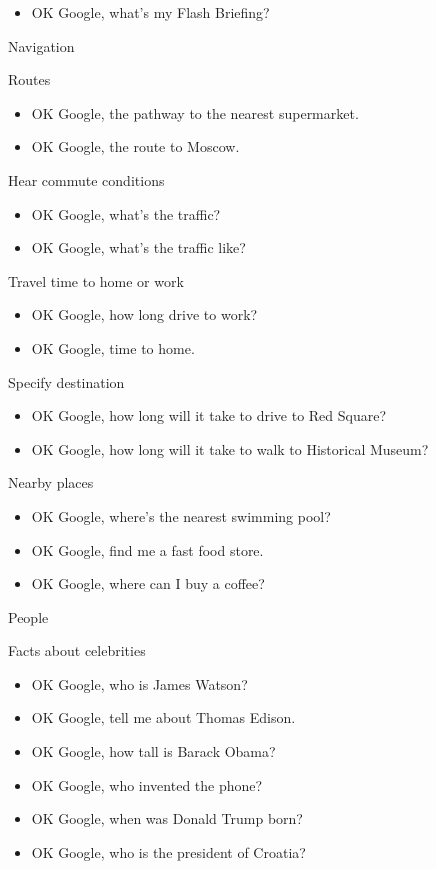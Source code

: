 \documentclass[
  a4paper,
]{article}
\providecommand{\tightlist}{%
  \setlength{\itemsep}{0pt}\setlength{\parskip}{0pt}}\usepackage{longtable,booktabs,array}
\begin{document}
\begin{itemize}
\tightlist
\item
  OK Google, what's my Flash Briefing?
\end{itemize}

Navigation

Routes

\begin{itemize}
\item
  OK Google, the pathway to the nearest supermarket.
\item
  OK Google, the route to Moscow.
\end{itemize}

Hear commute conditions

\begin{itemize}
\item
  OK Google, what's the traffic?
\item
  OK Google, what's the traffic like?
\end{itemize}

Travel time to home or work

\begin{itemize}
\item
  OK Google, how long drive to work?
\item
  OK Google, time to home.
\end{itemize}

Specify destination

\begin{itemize}
\item
  OK Google, how long will it take to drive to Red Square?
\item
  OK Google, how long will it take to walk to Historical Museum?
\end{itemize}

Nearby places

\begin{itemize}
\item
  OK Google, where's the nearest swimming pool?
\item
  OK Google, find me a fast food store.
\item
  OK Google, where can I buy a coffee?
\end{itemize}

People

Facts about celebrities

\begin{itemize}
\item
  OK Google, who is James Watson?
\item
  OK Google, tell me about Thomas Edison.
\item
  OK Google, how tall is Barack Obama?
\item
  OK Google, who invented the phone?
\item
  OK Google, when was Donald Trump born?
\item
  OK Google, who is the president of Croatia?
\end{itemize}
\end{document}
